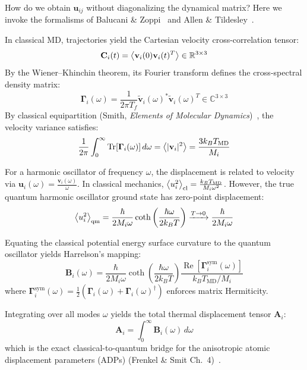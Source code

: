 \documentclass[11pt,a4paper]{article}
\theoremstyle{definition}
\begin{document}
How do we obtain $\mathbf{u}_{ij}$ without diagonalizing the dynamical matrix? Here we invoke the formalisms of Balucani \& Zoppi~\cite{balucani} and Allen \& Tildesley~\cite{allen_tildesley}.

In classical MD, trajectories yield the Cartesian velocity cross-correlation tensor:
\begin{equation}
\mathbf{C}_i(t) = \ev{\mathbf{v}_i(0) \mathbf{v}_i(t)^T} \in \mathbb{R}^{3 \times 3}
\end{equation}
By the Wiener--Khinchin theorem, its Fourier transform defines the cross-spectral density matrix:
\begin{equation}
\mathbf{\Gamma}_i(\omega) = \frac{1}{2\pi T_f} \tilde{\mathbf{v}}_i(\omega)^* \tilde{\mathbf{v}}_i(\omega)^T \in \mathbb{C}^{3 \times 3}
\end{equation}
By classical equipartition (Smith, \emph{Elements of Molecular Dynamics})~\cite{smith}, the velocity variance satisfies:
\begin{equation}
\frac{1}{2\pi} \int_0^\infty \Tr[\mathbf{\Gamma}_i(\omega)] \, d\omega = \ev{|\mathbf{v}_i|^2} = \frac{3 k_B T_{\text{MD}}}{M_i}
\end{equation}

For a harmonic oscillator of frequency $\omega$, the displacement is related to velocity via $\mathbf{u}_i(\omega) = \frac{\mathbf{v}_i(\omega)}{\omega}$. In classical mechanics, $\ev{u_i^2}_{\text{cl}} = \frac{k_B T_{\text{MD}}}{M_i \omega^2}$. However, the true quantum harmonic oscillator ground state has zero-point displacement:
\begin{equation}
\ev{u_i^2}_{\text{qm}} = \frac{\hbar}{2 M_i \omega} \coth\left( \frac{\hbar \omega}{2 k_B T} \right) \xrightarrow{T \to 0} \frac{\hbar}{2 M_i \omega}
\end{equation}

Equating the classical potential energy surface curvature to the quantum oscillator yields Harrelson's mapping:
\begin{equation}
\mathbf{B}_i(\omega) = \frac{\hbar}{2 M_i \omega} \coth\left( \frac{\hbar \omega}{2 k_B T} \right) \frac{\operatorname{Re}[\mathbf{\Gamma}_i^{\text{sym}}(\omega)]}{k_B T_{\text{MD}} / M_i}
\end{equation}
where $\mathbf{\Gamma}_i^{\text{sym}}(\omega) = \frac{1}{2}(\mathbf{\Gamma}_i(\omega) + \mathbf{\Gamma}_i(\omega)^\dagger)$ enforces matrix Hermiticity.

Integrating over all modes $\omega$ yields the total thermal displacement tensor $\mathbf{A}_i$:
\begin{equation}
\mathbf{A}_i = \int_0^\infty \mathbf{B}_i(\omega) \, d\omega
\end{equation}
which is the exact classical-to-quantum bridge for the anisotropic atomic displacement parameters (ADPs) (Frenkel \& Smit Ch.~4)~\cite{frenkel_smit}.
\end{document}
